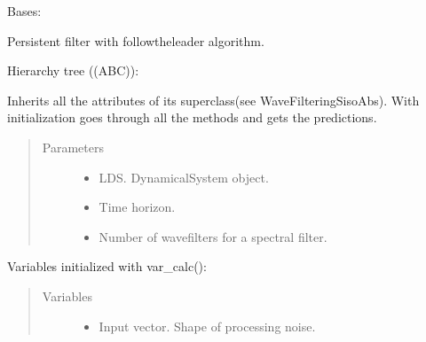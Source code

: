\documentclass[letterpaper,10pt,english]{sphinxmanual}
\begin{document}
\begin{fulllineitems}
\label{\detokenize{LDS.LDS.filters:LDS.LDS.filters.wave_filtering_siso_ftl_persistent.WaveFilteringSisoFtlPersistent}}
\sphinxAtStartPar
Bases: {\hyperref[\detokenize{LDS.LDS.filters:LDS.LDS.filters.wave_filtering_siso_abs.WaveFilteringSisoAbs}]{}}

\sphinxAtStartPar
Persistent filter with follow\sphinxhyphen{}the\sphinxhyphen{}leader algorithm.

\sphinxAtStartPar
Hierarchy tree ((ABC)):

\noindent{}

\sphinxAtStartPar
Inherits all the attributes of its superclass(see WaveFilteringSisoAbs).
With initialization goes through all the methods and gets the predictions.
\begin{quote}\begin{description}
\item[{Parameters}] \leavevmode\begin{itemize}
\item {} 
\sphinxAtStartPar
{} \textendash{} LDS. DynamicalSystem object.

\item {} 
\sphinxAtStartPar
{} \textendash{} Time horizon.

\item {} 
\sphinxAtStartPar
{} \textendash{} Number of wave\sphinxhyphen{}filters for a spectral filter.

\end{itemize}

\end{description}\end{quote}

\sphinxAtStartPar
Variables initialized with var\_calc():
\begin{quote}\begin{description}
\item[{Variables}] \leavevmode\begin{itemize}
\item {} 
\sphinxAtStartPar
{} \textendash{} Input vector. Shape of processing noise.


\end{itemize}
\end{description}
\end{quote}
\end{fulllineitems}
\end{document}
